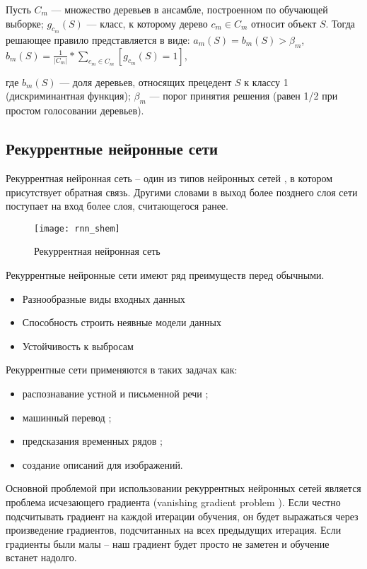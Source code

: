 Пусть $C_m$ — множество деревьев в ансамбле, построенном по обучающей выборке; $g_{c_m}(S)$ — класс, к которому дерево $c_m \in C_m$ относит объект $S$. Тогда решающее правило представляется в виде:
$a_m(S) = b_m(S) > \beta_m$, $b_m(S) = \frac{1}{|C_m|}*\sum_{c_m \in C_m}[g_{c_m}(S) = 1]$,

где $b_m(S)$ — доля деревьев, относящих прецедент $S$ к классу 1 (дискриминантная функция); $\beta_m$ — порог принятия решения (равен 1/2 при простом голосовании деревьев).

\subsection{Рекуррентные нейронные сети}
Рекуррентная нейронная сеть – один из типов нейронных сетей \cite{neural_network}, в котором присутствует обратная связь. Другими словами в выход более позднего слоя сети поступает на вход более слоя, считающегося ранее.
\begin{figure}[h]
	\begin{center}
		\texttt{[image: rnn\_shem]}
		\caption{Рекуррентная нейронная сеть}
		\label{ris:rnn_shem}
	\end{center}
\end{figure}


Рекуррентные нейронные сети имеют ряд преимуществ перед обычными.
\begin{itemize}
	\item Разнообразные виды входных данных
	\item Способность строить неявные модели данных
	\item Устойчивость к выбросам
\end{itemize}

Рекуррентные сети применяются в таких задачах как:
\begin{itemize}
	\item распознавание устной и письменной речи \cite{rnn_for_speech_recognition, rnn_for_text_recognition};
	\item машинный перевод \cite{rnn_for_translation};
	\item предсказания временных рядов \cite{rnn_for_prediction};
	\item создание описаний для изображений.
\end{itemize}

Основной проблемой при использовании рекуррентных нейронных сетей является проблема исчезающего градиента (vanishing gradient problem \cite{vanishing_gradient_problem}). Если честно подсчитывать градиент на каждой итерации обучения, он будет выражаться через произведение градиентов, подсчитанных на всех предыдущих итерация. Если градиенты были малы – наш градиент будет просто не заметен и обучение встанет надолго. 

